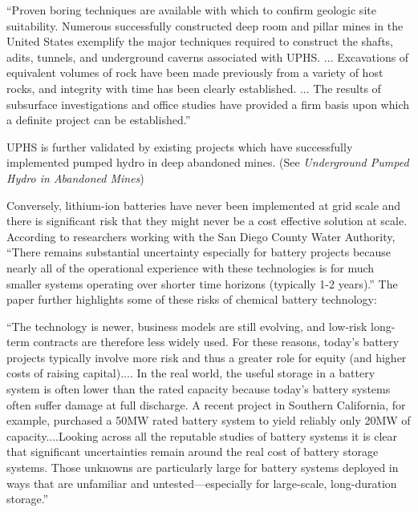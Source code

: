 \documentclass[hidelinks,12pt,a4paper]{article}
\begin{document}
\begin{displayquote}
“Proven boring techniques are available with which to confirm geologic site suitability. Numerous successfully constructed deep room and pillar mines in the United States exemplify the major techniques required to construct the shafts, adits, tunnels, and underground caverns associated with UPHS.
...
Excavations of equivalent volumes of rock have been made previously from a variety of host rocks, and integrity with time has been clearly established.
...
The results of subsurface investigations and office studies have provided a firm basis upon which a definite project can be established.” \cite{UndergroundPumpedHydroelectricStorage}
\end{displayquote}

UPHS is further validated by existing projects which have successfully implemented pumped hydro in deep abandoned mines. (See \textit{Underground Pumped Hydro in Abandoned Mines})

Conversely, lithium-ion batteries have never been implemented at grid scale and there is significant risk that they might never be a cost effective solution at scale. According to researchers working with the San Diego County Water Authority, “There remains substantial uncertainty especially for battery projects because nearly all of the operational experience with these technologies is for much smaller systems operating over shorter time horizons (typically 1-2 years).” \cite{PumpedEnergyStorageVitalToCalifornia} The paper further highlights some of these risks of chemical battery technology:

\begin{displayquote}
“The technology is newer, business models are still evolving, and low-risk long-term contracts are therefore less widely used. For these reasons, today’s battery projects typically involve more risk and thus a greater role for equity (and higher costs of raising capital).... In the real world,
the useful storage in a battery system is often lower than the rated capacity because today’s battery systems often suffer damage at full discharge. A recent project in Southern California, for example, purchased a 50MW rated battery system to yield reliably only 20MW of capacity....Looking across all the reputable studies of battery systems it is clear that significant uncertainties remain around the real cost of battery storage systems. Those unknowns are particularly large for battery systems deployed in ways that are unfamiliar and untested—especially for large-scale, long-duration storage.” \cite{PumpedEnergyStorageVitalToCalifornia}
\end{displayquote}
\end{document}

